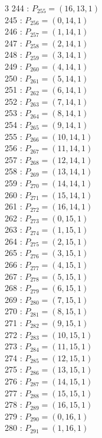 \documentclass{article}
\begin{document}
{\begin{multicols}{3}
244 : $P_{255}=( 16, 13, 1 )$\\
245 : $P_{256}=( 0, 14, 1 )$\\
246 : $P_{257}=( 1, 14, 1 )$\\
247 : $P_{258}=( 2, 14, 1 )$\\
248 : $P_{259}=( 3, 14, 1 )$\\
249 : $P_{260}=( 4, 14, 1 )$\\
250 : $P_{261}=( 5, 14, 1 )$\\
251 : $P_{262}=( 6, 14, 1 )$\\
252 : $P_{263}=( 7, 14, 1 )$\\
253 : $P_{264}=( 8, 14, 1 )$\\
254 : $P_{265}=( 9, 14, 1 )$\\
255 : $P_{266}=( 10, 14, 1 )$\\
256 : $P_{267}=( 11, 14, 1 )$\\
257 : $P_{268}=( 12, 14, 1 )$\\
258 : $P_{269}=( 13, 14, 1 )$\\
259 : $P_{270}=( 14, 14, 1 )$\\
260 : $P_{271}=( 15, 14, 1 )$\\
261 : $P_{272}=( 16, 14, 1 )$\\
262 : $P_{273}=( 0, 15, 1 )$\\
263 : $P_{274}=( 1, 15, 1 )$\\
264 : $P_{275}=( 2, 15, 1 )$\\
265 : $P_{276}=( 3, 15, 1 )$\\
266 : $P_{277}=( 4, 15, 1 )$\\
267 : $P_{278}=( 5, 15, 1 )$\\
268 : $P_{279}=( 6, 15, 1 )$\\
269 : $P_{280}=( 7, 15, 1 )$\\
270 : $P_{281}=( 8, 15, 1 )$\\
271 : $P_{282}=( 9, 15, 1 )$\\
272 : $P_{283}=( 10, 15, 1 )$\\
273 : $P_{284}=( 11, 15, 1 )$\\
274 : $P_{285}=( 12, 15, 1 )$\\
275 : $P_{286}=( 13, 15, 1 )$\\
276 : $P_{287}=( 14, 15, 1 )$\\
277 : $P_{288}=( 15, 15, 1 )$\\
278 : $P_{289}=( 16, 15, 1 )$\\
279 : $P_{290}=( 0, 16, 1 )$\\
280 : $P_{291}=( 1, 16, 1 )$\\

\end{multicols}}
\end{document}
